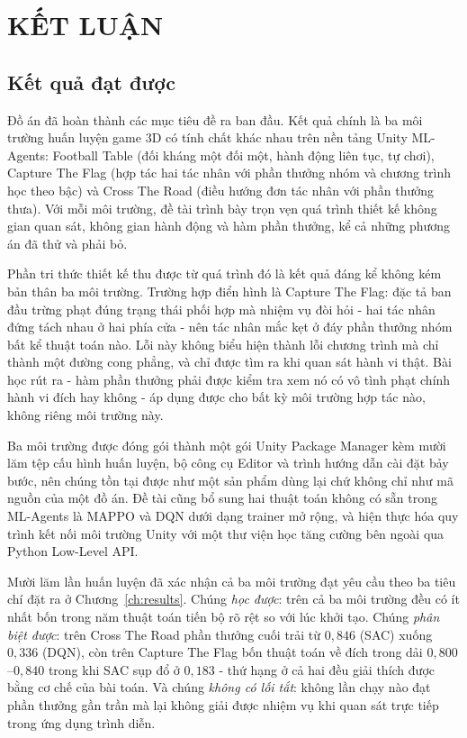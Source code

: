 \fontsize{13pt}{22.5pt}\selectfont

\section{KẾT LUẬN}

\subsection{Kết quả đạt được}
\indent Đồ án đã hoàn thành các mục tiêu đề ra ban đầu. Kết quả chính là ba môi trường
huấn luyện game 3D có tính chất khác nhau trên nền tảng Unity ML-Agents: Football Table
(đối kháng một đối một, hành động liên tục, tự chơi), Capture The Flag (hợp tác hai tác
nhân với phần thưởng nhóm và chương trình học theo bậc) và Cross The Road (điều hướng
đơn tác nhân với phần thưởng thưa). Với mỗi môi trường, đề tài trình bày trọn vẹn quá
trình thiết kế không gian quan sát, không gian hành động và hàm phần thưởng, kể cả những
phương án đã thử và phải bỏ.

\indent Phần tri thức thiết kế thu được từ quá trình đó là kết quả đáng kể không kém
bản thân ba môi trường. Trường hợp điển hình là Capture The Flag: đặc tả ban đầu trừng
phạt đúng trạng thái phối hợp mà nhiệm vụ đòi hỏi - hai tác nhân đứng tách nhau ở hai
phía cửa - nên tác nhân mắc kẹt ở đáy phần thưởng nhóm bất kể thuật toán nào. Lỗi này
không biểu hiện thành lỗi chương trình mà chỉ thành một đường cong phẳng, và chỉ được
tìm ra khi quan sát hành vi thật. Bài học rút ra - hàm phần thưởng phải được kiểm tra
xem nó có vô tình phạt chính hành vi đích hay không - áp dụng được cho bất kỳ môi trường
hợp tác nào, không riêng môi trường này.

\indent Ba môi trường được đóng gói thành một gói Unity Package Manager kèm mười lăm
tệp cấu hình huấn luyện, bộ công cụ Editor và trình hướng dẫn cài đặt bảy bước, nên
chúng tồn tại được như một sản phẩm dùng lại chứ không chỉ như mã nguồn của một đồ án.
Đề tài cũng bổ sung hai thuật toán không có sẵn trong ML-Agents là MAPPO và DQN dưới
dạng trainer mở rộng, và hiện thực hóa quy trình kết nối môi trường Unity với một thư
viện học tăng cường bên ngoài qua Python Low-Level API.

\indent Mười lăm lần huấn luyện đã xác nhận cả ba môi trường đạt yêu cầu theo ba tiêu
chí đặt ra ở Chương~\ref{ch:results}. Chúng \textit{học được}: trên cả ba môi trường
đều có ít nhất bốn trong năm thuật toán tiến bộ rõ rệt so với lúc khởi tạo. Chúng
\textit{phân biệt được}: trên Cross The Road phần thưởng cuối trải từ $0{,}846$ (SAC)
xuống $0{,}336$ (DQN), còn trên Capture The Flag bốn thuật toán về đích trong dải
$0{,}800$--$0{,}840$ trong khi SAC sụp đổ ở $0{,}183$ - thứ hạng ở cả hai đều giải thích
được bằng cơ chế của bài toán. Và chúng \textit{không có lối tắt}: không lần chạy nào
đạt phần thưởng gần trần mà lại không giải được nhiệm vụ khi quan sát trực tiếp trong
ứng dụng trình diễn.

